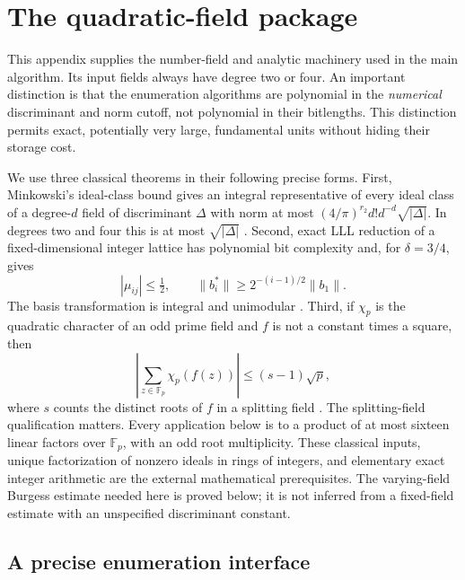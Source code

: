 \section{The quadratic-field package}
\label{sec:qp-package}

This appendix supplies the number-field and analytic machinery used in the
main algorithm.  Its input fields always have degree two or four.  An
important distinction is that the enumeration algorithms are polynomial in
the \emph{numerical} discriminant and norm cutoff, not polynomial in their
bitlengths.  This distinction permits exact, potentially very large,
fundamental units without hiding their storage cost.

We use three classical theorems in their following precise forms.  First,
Minkowski's ideal-class bound gives an integral representative of every
ideal class of a degree-$d$ field of discriminant $\Delta$ with norm at most
$(4/\pi)^{r_2}d!d^{-d}\sqrt{|\Delta|}$.  In degrees two and four this is at
most $\sqrt{|\Delta|}$ \cite{Neukirch1999}.  Second, exact LLL reduction of
a fixed-dimensional integer lattice has polynomial bit complexity and,
for $\delta=3/4$, gives
\begin{equation}
 |\mu_{ij}|\leq\tfrac12,
 \qquad \|b_i^*\|\geq2^{-(i-1)/2}\|b_1\|.
 \label{eq:qp-lll}
\end{equation}
The basis transformation is integral and unimodular
\cite{LLL1982}.  Third, if $\chi_p$ is the quadratic character of an odd
prime field and $f$ is not a constant times a square, then
\begin{equation}
 \left|\sum_{z\in\mathbb F_p}\chi_p(f(z))\right|
 \leq (s-1)\sqrt p,
 \label{eq:qp-weil}
\end{equation}
where $s$ counts the distinct roots of $f$ in a splitting field
\cite{Schmidt1976}.  The splitting-field qualification matters.  Every
application below is to a product of at most sixteen linear factors over
$\mathbb F_p$, with an odd root multiplicity.  These classical inputs,
unique factorization of nonzero ideals in rings of integers, and elementary
exact integer arithmetic are the external mathematical prerequisites.
The varying-field Burgess estimate needed here is proved below; it is not
inferred from a fixed-field estimate with an unspecified discriminant
constant.

\subsection{A precise enumeration interface}

